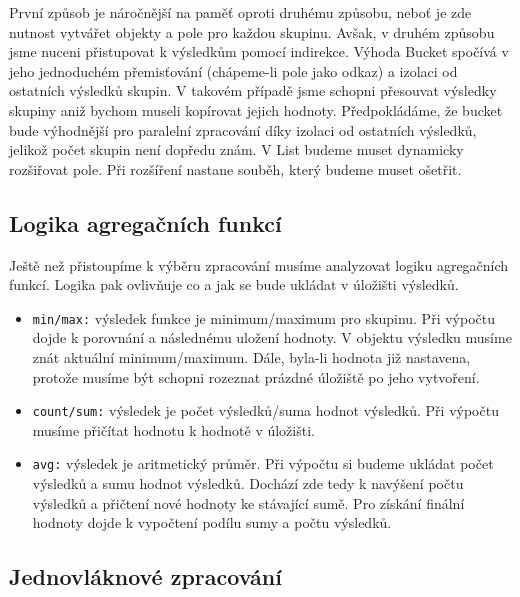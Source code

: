 První způsob je náročnější na paměť oproti druhému způsobu, neboť je zde nutnost vytvářet objekty a pole pro každou skupinu.
Avšak, v druhém způsobu jsme nuceni přistupovat k výsledkům pomocí indirekce.
Výhoda Bucket spočívá v jeho jednoduchém přemisťování (chápeme-li pole jako odkaz) a izolaci od ostatních výsledků skupin.
V takovém případě jsme schopni přesouvat výsledky skupiny aniž bychom museli kopírovat jejich hodnoty.
Předpokládáme, že bucket bude výhodnější pro paralelní zpracování díky izolaci od ostatních výsledků, jelikož počet skupin není dopředu znám.
V List budeme muset dynamicky rozšiřovat pole.
Při rozšíření nastane souběh, který budeme muset ošetřit.

\subsection{Logika agregačních funkcí}

Ještě než přistoupíme k výběru zpracování musíme analyzovat logiku agregačních funkcí.
Logika pak ovlivňuje co a jak se bude ukládat v úložišti výsledků.

\begin{itemize}
\item \texttt{min/max:} výsledek funkce je minimum/maximum pro skupinu. 
Při výpočtu dojde k porovnání a následnému uložení hodnoty.
V objektu výsledku musíme znát aktuální minimum/maximum.
Dále, byla-li hodnota již nastavena, protože musíme být schopni rozeznat prázdné úložiště po jeho vytvoření.


\item \texttt{count/sum:} výsledek je počet výsledků/suma hodnot výsledků. 
Při výpočtu musíme přičítat hodnotu k hodnotě v úložišti.

\item \texttt{avg:} výsledek je aritmetický průměr.
Při výpočtu si budeme ukládat počet výsledků a sumu hodnot výsledků.
Dochází zde tedy k navýšení počtu výsledků a přičtení nové hodnoty ke stávající sumě.
Pro získání finální hodnoty dojde k vypočtení podílu sumy a počtu výsledků.
\end{itemize}

\subsection{Jednovláknové zpracování} \label{anal.groupby.singlethread}

